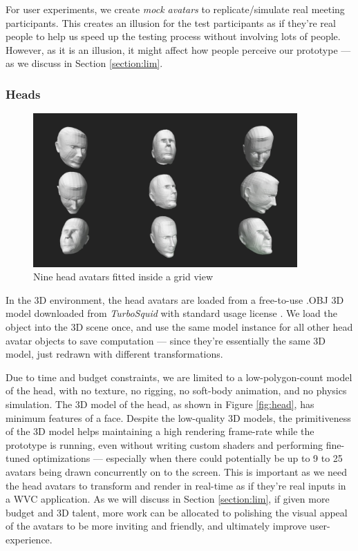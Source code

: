 For user experiments, we create \textit{mock avatars} to replicate/simulate real meeting participants. This creates an illusion for the test participants as if they’re real people to help us speed up the testing process without involving lots of people. However, as it is an illusion, it might affect how people perceive our prototype --- as we discuss in Section \ref{section:lim}.


\subsubsection{Heads}

\begin{figure}
	\centering
 	\includegraphics[width=0.9\textwidth]{headgrid.png}
	\caption{Nine head avatars fitted inside a grid view}
	\label{fig:headgrid}
\end{figure}

In the 3D environment, the head avatars are loaded from a free-to-use .OBJ 3D model downloaded from \textit{TurboSquid} with standard usage license \cite{RN104}. 
We load the object into the 3D scene once, and use the same model instance for all other head avatar objects to save computation --- since they’re essentially the same 3D model, just redrawn with different transformations.

Due to time and budget constraints, we are limited to a low-polygon-count model of the head, with no texture, no rigging, no soft-body animation, and no physics simulation. The 3D model of the head, as shown in Figure \ref{fig:head}, has minimum features of a face. Despite the low-quality 3D models, the primitiveness of the 3D model helps maintaining a high rendering frame-rate while the prototype is running, even without writing custom shaders and performing fine-tuned optimizations --- especially when there could potentially be up to 9 to 25 avatars being drawn concurrently on to the screen. This is important as we need the head avatars to transform and render in real-time as if they’re real inputs in a WVC application.
As we will discuss in Section \ref{section:lim}, if given more budget and 3D talent, more work can be allocated to polishing the visual appeal of the avatars to be more inviting and friendly, and ultimately improve user-experience.

